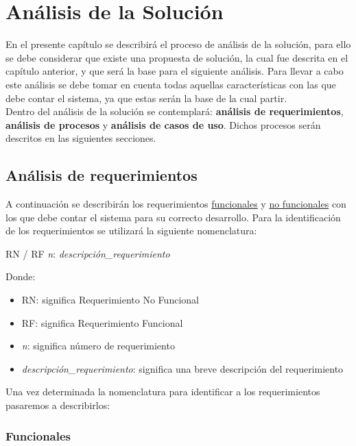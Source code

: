\hypertarget{cv:analisisSol
	ucion}{
	\chapter{Análisis de la Solución}
}

En el presente capítulo se describirá el proceso de análisis de la solución, para ello se debe considerar que existe una propuesta de solución, la cual fue descrita en el capítulo anterior, y que será la base para el siguiente análisis. Para llevar a cabo este análisis se debe tomar en cuenta todas aquellas características con las que debe contar el sistema, ya que estas serán la base de la cual partir. \\ 

Dentro del análisis de la solución se contemplará: \textbf{análisis de requerimientos}, \textbf{análisis de procesos} y \textbf{análisis de casos de uso}. Dichos procesos serán descritos en las siguientes secciones.

\section{Análisis de requerimientos}
A continuación se describirán los requerimientos \hyperlink{cv:funcionales}{funcionales} y \hyperlink{cv:noFuncionales}{no funcionales} con los que debe contar el sistema para su correcto desarrollo. Para la identificación de los requerimientos se utilizará la siguiente nomenclatura: 

\begin{center}
\Huge{RN / RF \textit{n}: \textit{descripción\_requerimiento}}
\end{center} 

Donde: 

\begin{itemize}
	\item RN: significa Requerimiento No Funcional
	\item RF: significa Requerimiento Funcional
	\item \textit{n}: significa número de requerimiento
	\item \textit{descripción\_requerimiento}: significa una breve descripción del requerimiento
\end{itemize}

Una vez determinada la nomenclatura para identificar a los requerimientos pasaremos a describirlos: 
\hypertarget{cv:funcionales}{\subsection{Funcionales}}

